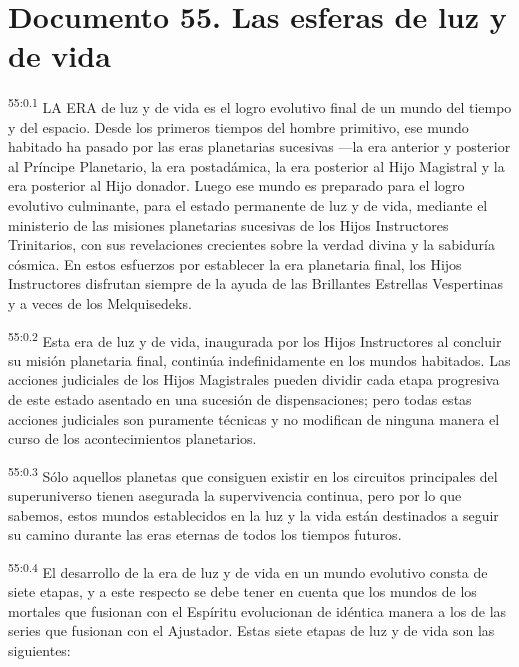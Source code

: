 \chapter{Documento 55. Las esferas de luz y de vida}
\par
\textsuperscript{55:0.1} LA ERA de luz y de vida es el logro evolutivo final de un mundo del tiempo y del espacio. Desde los primeros tiempos del hombre primitivo, ese mundo habitado ha pasado por las eras planetarias sucesivas ---la era anterior y posterior al Príncipe Planetario, la era postadámica, la era posterior al Hijo Magistral y la era posterior al Hijo donador. Luego ese mundo es preparado para el logro evolutivo culminante, para el estado permanente de luz y de vida, mediante el ministerio de las misiones planetarias sucesivas de los Hijos Instructores Trinitarios, con sus revelaciones crecientes sobre la verdad divina y la sabiduría cósmica. En estos esfuerzos por establecer la era planetaria final, los Hijos Instructores disfrutan siempre de la ayuda de las Brillantes Estrellas Vespertinas y a veces de los Melquisedeks.

\par
\textsuperscript{55:0.2} Esta era de luz y de vida, inaugurada por los Hijos Instructores al concluir su misión planetaria final, continúa indefinidamente en los mundos habitados. Las acciones judiciales de los Hijos Magistrales pueden dividir cada etapa progresiva de este estado asentado en una sucesión de dispensaciones; pero todas estas acciones judiciales son puramente técnicas y no modifican de ninguna manera el curso de los acontecimientos planetarios.

\par
\textsuperscript{55:0.3} Sólo aquellos planetas que consiguen existir en los circuitos principales del superuniverso tienen asegurada la supervivencia continua, pero por lo que sabemos, estos mundos establecidos en la luz y la vida están destinados a seguir su camino durante las eras eternas de todos los tiempos futuros.

\par
\textsuperscript{55:0.4} El desarrollo de la era de luz y de vida en un mundo evolutivo consta de siete etapas, y a este respecto se debe tener en cuenta que los mundos de los mortales que fusionan con el Espíritu evolucionan de idéntica manera a los de las series que fusionan con el Ajustador. Estas siete etapas de luz y de vida son las siguientes:


